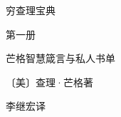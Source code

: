 \thispagestyle{empty}
\vspace*{3em}
\begin{center}
  {\xbsong{}穷查理宝典\par}
  \vspace{1em}
  {\kaishu{}第一册\par}
  \vspace{1.5em}
  {\heiti{}芒格智慧箴言与私人书单\par}
  \vspace{4em}
  {\kaishu〔美〕查理·芒格\q 著\par}
  \vspace{0.8em}
  {\kaishu 李继宏\q 译\par}
\end{center}
\cleardoublepage
